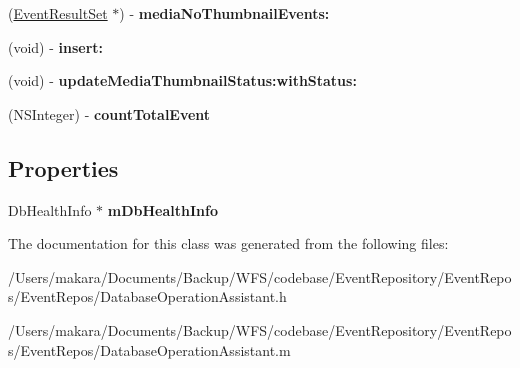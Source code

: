 \begin{DoxyCompactItemize}
\item 
\hypertarget{interface_database_operation_assistant_aa1104bd76ce18e7f83158197684958e6}{
(\hyperlink{interface_event_result_set}{\-Event\-Result\-Set} $\ast$) -\/ {\bfseries media\-No\-Thumbnail\-Events\-:}}
\label{interface_database_operation_assistant_aa1104bd76ce18e7f83158197684958e6}

\item 
\hypertarget{interface_database_operation_assistant_a512786e79db90b7c236848775e31e639}{
(void) -\/ {\bfseries insert\-:}}
\label{interface_database_operation_assistant_a512786e79db90b7c236848775e31e639}

\item 
\hypertarget{interface_database_operation_assistant_a3a7f8ecca067b6c30bb3392631a80e77}{
(void) -\/ {\bfseries update\-Media\-Thumbnail\-Status\-:with\-Status\-:}}
\label{interface_database_operation_assistant_a3a7f8ecca067b6c30bb3392631a80e77}

\item 
\hypertarget{interface_database_operation_assistant_a24986043f2990e6756268474496d44c7}{
(\-N\-S\-Integer) -\/ {\bfseries count\-Total\-Event}}
\label{interface_database_operation_assistant_a24986043f2990e6756268474496d44c7}

\end{DoxyCompactItemize}
\subsection*{\-Properties}
\begin{DoxyCompactItemize}
\item 
\hypertarget{interface_database_operation_assistant_a6fdb3b8ba56a4ae03d07b1a7dd8850b7}{
\-Db\-Health\-Info $\ast$ {\bfseries m\-Db\-Health\-Info}}
\label{interface_database_operation_assistant_a6fdb3b8ba56a4ae03d07b1a7dd8850b7}

\end{DoxyCompactItemize}


\-The documentation for this class was generated from the following files\-:\begin{DoxyCompactItemize}
\item 
/\-Users/makara/\-Documents/\-Backup/\-W\-F\-S/codebase/\-Event\-Repository/\-Event\-Repos/\-Event\-Repos/\-Database\-Operation\-Assistant.\-h\item 
/\-Users/makara/\-Documents/\-Backup/\-W\-F\-S/codebase/\-Event\-Repository/\-Event\-Repos/\-Event\-Repos/\-Database\-Operation\-Assistant.\-m\end{DoxyCompactItemize}
